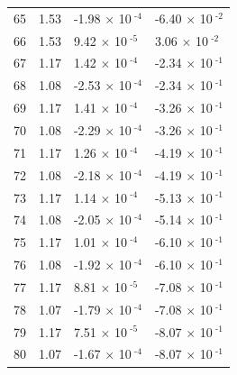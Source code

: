 \documentclass[a4paper,11pt]{article}
\begin{document}
\begin{center}
\begin{longtable}{|R{1.5cm}|R{2.5cm}|R{2.5cm}|R{2.5cm}|}
   65 &   1.53  &        -1.98 $\times$ 10$^{\text{          -4}}$  &        -6.40 $\times$ 10$^{\text{          -2}}$ \\ 
   66 &   1.53  &         9.42 $\times$ 10$^{\text{          -5}}$  &         3.06 $\times$ 10$^{\text{          -2}}$ \\ 
   67 &   1.17  &         1.42 $\times$ 10$^{\text{          -4}}$  &        -2.34 $\times$ 10$^{\text{          -1}}$ \\ 
   68 &   1.08  &        -2.53 $\times$ 10$^{\text{          -4}}$  &        -2.34 $\times$ 10$^{\text{          -1}}$ \\ 
   69 &   1.17  &         1.41 $\times$ 10$^{\text{          -4}}$  &        -3.26 $\times$ 10$^{\text{          -1}}$ \\ 
   70 &   1.08  &        -2.29 $\times$ 10$^{\text{          -4}}$  &        -3.26 $\times$ 10$^{\text{          -1}}$ \\ 
   71 &   1.17  &         1.26 $\times$ 10$^{\text{          -4}}$  &        -4.19 $\times$ 10$^{\text{          -1}}$ \\ 
   72 &   1.08  &        -2.18 $\times$ 10$^{\text{          -4}}$  &        -4.19 $\times$ 10$^{\text{          -1}}$ \\ 
   73 &   1.17  &         1.14 $\times$ 10$^{\text{          -4}}$  &        -5.13 $\times$ 10$^{\text{          -1}}$ \\ 
   74 &   1.08  &        -2.05 $\times$ 10$^{\text{          -4}}$  &        -5.14 $\times$ 10$^{\text{          -1}}$ \\ 
   75 &   1.17  &         1.01 $\times$ 10$^{\text{          -4}}$  &        -6.10 $\times$ 10$^{\text{          -1}}$ \\ 
   76 &   1.08  &        -1.92 $\times$ 10$^{\text{          -4}}$  &        -6.10 $\times$ 10$^{\text{          -1}}$ \\ 
   77 &   1.17  &         8.81 $\times$ 10$^{\text{          -5}}$  &        -7.08 $\times$ 10$^{\text{          -1}}$ \\ 
   78 &   1.07  &        -1.79 $\times$ 10$^{\text{          -4}}$  &        -7.08 $\times$ 10$^{\text{          -1}}$ \\ 
   79 &   1.17  &         7.51 $\times$ 10$^{\text{          -5}}$  &        -8.07 $\times$ 10$^{\text{          -1}}$ \\ 
   80 &   1.07  &        -1.67 $\times$ 10$^{\text{          -4}}$  &        -8.07 $\times$ 10$^{\text{          -1}}$ \\ 

\end{longtable}
\end{center}
\end{document}
